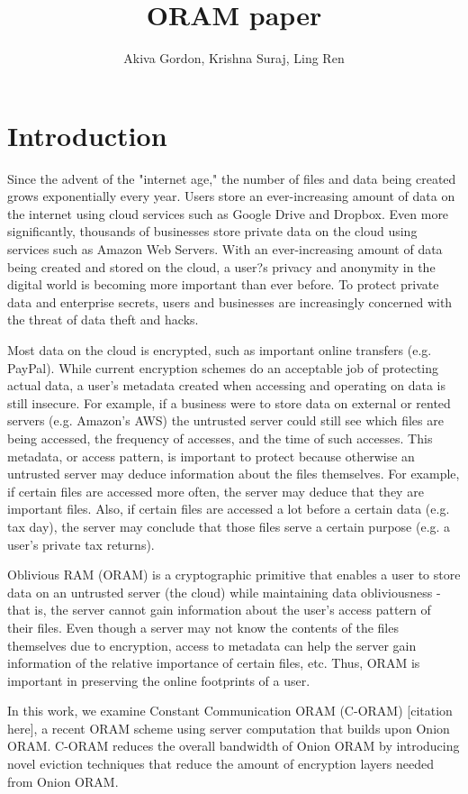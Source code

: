 \documentclass[12pt, oneside]{amsart}   	%
\title{ORAM paper}
\author{Akiva Gordon, Krishna Suraj, Ling Ren}
\begin{document}
\maketitle
\section{Introduction}
Since the advent of the "internet age," the number of files and data being created grows exponentially every year. Users store an ever-increasing amount of data on the internet using cloud services such as Google Drive and Dropbox. Even more significantly, thousands of businesses store private data on the cloud using services such as Amazon Web Servers. With an ever-increasing amount of data being created and stored on the cloud, a user?s privacy and anonymity in the digital world is becoming more important than ever before. To protect private data and enterprise secrets, users and businesses are increasingly concerned with the threat of data theft and hacks.

Most data on the cloud is encrypted, such as important online transfers (e.g. PayPal). While current encryption schemes do an acceptable job of protecting actual data, a user's metadata created when accessing and operating on data is still insecure. For example, if a business were to store data on external or rented servers (e.g. Amazon's AWS) the untrusted server could still see which files are being accessed, the frequency of accesses, and the time of such accesses. This metadata, or access pattern, is important to protect because otherwise an untrusted server may deduce information about the files themselves. For example, if certain files are accessed more often, the server may deduce that they are important files. Also, if certain files are accessed a lot before a certain data (e.g. tax day), the server may conclude that those files serve a certain purpose (e.g. a user's private tax returns).

Oblivious RAM (ORAM) is a cryptographic primitive that enables a user to store data on an untrusted server (the cloud) while maintaining data obliviousness - that is, the server cannot gain information about the user's access pattern of their files. Even though a server may not know the contents of the files themselves due to encryption, access to metadata can help the server gain information of the relative importance of certain files, etc. Thus, ORAM is important in preserving the online footprints of a user. 

In this work, we examine Constant Communication ORAM (C-ORAM) [citation here], a recent ORAM scheme using server computation that builds upon Onion ORAM. C-ORAM reduces the overall bandwidth of Onion ORAM by introducing novel eviction techniques that reduce the amount of encryption layers needed from Onion ORAM.
\end{document}
